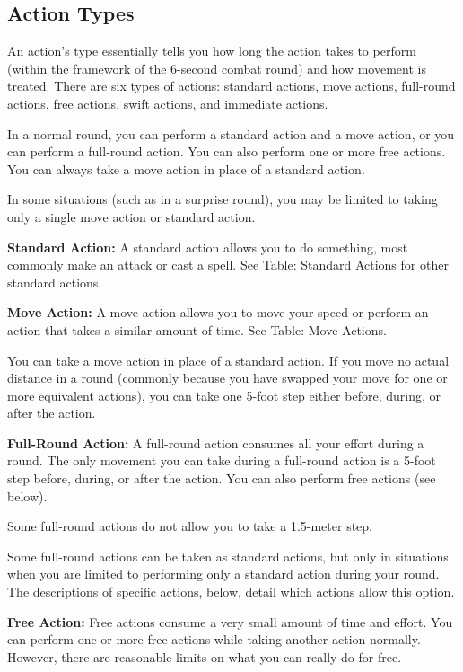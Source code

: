 \subsection{Action Types}
An action's type essentially tells you how long the action takes to perform (within the framework of the 6-second combat round) and how movement is treated. There are six types of actions: standard actions, move actions, full-round actions, free actions, swift actions, and immediate actions.

In a normal round, you can perform a standard action and a move action, or you can perform a full-round action. You can also perform one or more free actions. You can always take a move action in place of a standard action.

In some situations (such as in a surprise round), you may be limited to taking only a single move action or standard action.

\textbf{Standard Action:} A standard action allows you to do something, most commonly make an attack or cast a spell. See Table: Standard Actions for other standard actions.

\textbf{Move Action:} A move action allows you to move your speed or perform an action that takes a similar amount of time. See Table: Move Actions.

You can take a move action in place of a standard action. If you move no actual distance in a round (commonly because you have swapped your move for one or more equivalent actions), you can take one 5-foot step either before, during, or after the action.

\textbf{Full-Round Action:} A full-round action consumes all your effort during a round. The only movement you can take during a full-round action is a 5-foot step before, during, or after the action. You can also perform free actions (see below).

Some full-round actions do not allow you to take a 1.5-meter step.

Some full-round actions can be taken as standard actions, but only in situations when you are limited to performing only a standard action during your round. The descriptions of specific actions, below, detail which actions allow this option.

\textbf{Free Action:} Free actions consume a very small amount of time and effort. You can perform one or more free actions while taking another action normally. However, there are reasonable limits on what you can really do for free.

